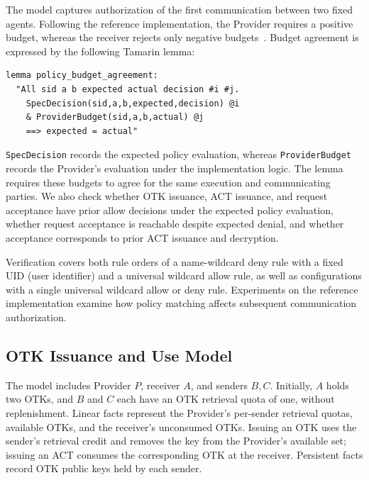 The model captures authorization of the first communication between two fixed agents. Following the reference implementation, the Provider requires a positive budget, whereas the receiver rejects only negative budgets~\cite{sagaReferenceImpl2026}. Budget agreement is expressed by the following Tamarin lemma:

\begingroup
\renewcommand{\verbatimsize}{\footnotesize}
\setlength{\verbatimbaselineskip}{10pt}
\noindent\begin{minipage}{\linewidth}
\begin{verbatim}
lemma policy_budget_agreement:
  "All sid a b expected actual decision #i #j.
    SpecDecision(sid,a,b,expected,decision) @i
    & ProviderBudget(sid,a,b,actual) @j
    ==> expected = actual"
\end{verbatim}
\end{minipage}
\endgroup

\texttt{SpecDecision} records the expected policy evaluation, whereas \texttt{ProviderBudget} records the Provider's evaluation under the implementation logic. The lemma requires these budgets to agree for the same execution and communicating parties. We also check whether OTK issuance, ACT issuance, and request acceptance have prior allow decisions under the expected policy evaluation, whether request acceptance is reachable despite expected denial, and whether acceptance corresponds to prior ACT issuance and decryption.

Verification covers both rule orders of a name-wildcard deny rule with a fixed UID (user identifier) and a universal wildcard allow rule, as well as configurations with a single universal wildcard allow or deny rule. Experiments on the reference implementation examine how policy matching affects subsequent communication authorization.

\subsection{OTK Issuance and Use Model}
\label{subsec:otk-issuance-use-model}

The model includes Provider $P$, receiver $A$, and senders $B,C$. Initially, $A$ holds two OTKs, and $B$ and $C$ each have an OTK retrieval quota of one, without replenishment. Linear facts represent the Provider's per-sender retrieval quotas, available OTKs, and the receiver's unconsumed OTKs. Issuing an OTK uses the sender's retrieval credit and removes the key from the Provider's available set; issuing an ACT consumes the corresponding OTK at the receiver. Persistent facts record OTK public keys held by each sender.

